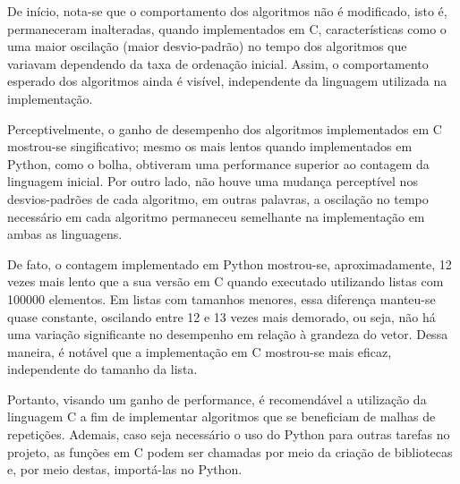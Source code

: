 De início, nota-se que o comportamento dos algoritmos não é modificado, isto é, permaneceram inalteradas, quando implementados em C, características como o uma maior oscilação (maior desvio-padrão) no tempo dos algoritmos que variavam dependendo da taxa de ordenação inicial.
Assim, o comportamento esperado dos algoritmos ainda é visível, independente da linguagem utilizada na implementação.


Perceptivelmente, o ganho de desempenho dos algoritmos implementados em C mostrou-se singificativo; mesmo os mais lentos quando implementados em Python, como o bolha, obtiveram uma performance superior ao contagem da linguagem inicial.
Por outro lado, não houve uma mudança perceptível nos desvios-padrões de cada algoritmo, em outras palavras, a oscilação no tempo necessário em cada algoritmo permaneceu semelhante na implementação em ambas as linguagens.


De fato, o contagem implementado em Python mostrou-se, aproximadamente, 12 vezes mais lento que a sua versão em C quando executado utilizando listas com 100000 elementos. Em listas com tamanhos menores, essa diferença manteu-se quase constante, oscilando entre 12 e 13 vezes mais demorado, ou seja, não há uma variação significante no desempenho em relação à grandeza do vetor. Dessa maneira, é notável que a implementação em C mostrou-se mais eficaz, independente do tamanho da lista.


Portanto, visando um ganho de performance, é recomendável a utilização da linguagem C a fim de implementar algoritmos que se beneficiam de malhas de repetições.
Ademais, caso seja necessário o uso do Python para outras tarefas no projeto, as funções em C podem ser chamadas por meio da criação de bibliotecas e, por meio destas, importá-las no Python.
